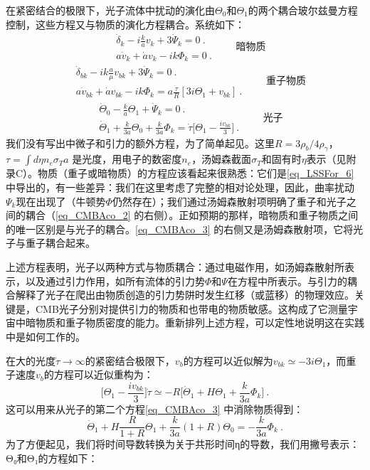 在紧密结合的极限下，光子流体中扰动的演化由$\Theta_0$和$\Theta_1$的两个耦合玻尔兹曼方程控制，这些方程又与物质的演化方程耦合。系统如下：
\begin{equation}
\begin{aligned}
& \dot{\delta}_k - i \frac{k}{a} v_k + 3 \dot{\Psi}_k = 0~. \\
& a \dot{v}_k + \dot{a} v_k - ik \Phi_k = 0~. 
\end{aligned} \quad \quad \text{暗物质}
\end{equation} 
\begin{equation}\label{eq_CMBAco_2}
\begin{aligned} 
&\dot{\delta}_{bk} - ik \frac{a}{\mu} v_{bk} + 3 \dot{\Psi}_k = 0~. \\
& a \dot{v}_{bk} + \dot{a} v_{bk} - ik \Phi_k = a  \frac{\dot{\tau}}{R}[3 i \Theta_1 + v_{bk}]~.
\end{aligned} \quad \quad \text{重子物质}
\end{equation}
\begin{equation}\label{eq_CMBAco_3}
\begin{aligned} 
&\dot{\Theta}_0 -  \frac{k}{a} \Theta_1 + \dot{\Psi}_k = 0~. \\
& \dot{\Theta}_1 +  \frac{k}{3 a} \Theta_0 +  \frac{k}{3 a} \Phi_k = \dot{\tau} \bigg[\Theta_1 -\frac{ i v_{bk}}{3}\bigg]~. 
\end{aligned} \quad \quad \text{光子}
\end{equation} 
我们没有写出中微子和引力的额外方程，为了简单起见。这里$R = 3\rho_b/4\rho_\gamma$，$\tau = \int d\eta n_e \sigma_T a$ 是光度，用电子的数密度$n_e$，汤姆森截面$\sigma_T$和固有时$\eta$表示（见附录C）。物质（重子或暗物质）的方程应该看起来很熟悉：它们是\autoref{eq_LSSFor_6} 中导出的，有一些差异：我们在这里考虑了完整的相对论处理，因此，曲率扰动$\Psi_k$现在出现了（牛顿势$\Phi$仍然存在）；我们通过汤姆森散射项明确了重子和光子之间的耦合（\autoref{eq_CMBAco_2} 的右侧）。正如预期的那样，暗物质和重子物质之间的唯一区别是与光子的耦合。\autoref{eq_CMBAco_3} 的右侧又是汤姆森散射项，它将光子与重子耦合起来。

上述方程表明，光子以两种方式与物质耦合：通过电磁作用，如汤姆森散射所表示，以及通过引力作用，如所有流体的引力势$\Phi$和$\Psi$在方程中所表示。与引力的耦合解释了光子在爬出由物质创造的引力势阱时发生红移（或蓝移）的物理效应。关键是，CMB光子分别对提供引力的物质和也带电的物质敏感。这构成了它测量宇宙中暗物质和重子物质密度的能力。重新排列上述方程，可以定性地说明这在实践中是如何工作的。

在大的光度$\dot \tau \rightarrow \infty$的紧密结合极限下，$v_b$的方程可以近似解为$v_{bk} \simeq -3 i\Theta_1$，而重子速度$v_b$的方程可以近似重构为：
\begin{equation}
\bigg[\Theta_1 - \frac{i v_{bk}}{3}\bigg]\dot \tau\simeq -R \bigg[\dot \Theta_1 +H \Theta_1 +\frac{k}{3 a}\Phi_k\bigg]~.
\end{equation}
这可以用来从光子的第二个方程\autoref{eq_CMBAco_3} 中消除物质得到：
\begin{equation}
\dot{\Theta}_1 + H \frac{R}{1 + R} \Theta_1 + \frac{k}{3a} (1 + R) \Theta_0 = -\frac{k}{3a} \Phi_k~. 
\end{equation} 
为了方便起见，我们将时间导数转换为关于共形时间η的导数，我们用撇号表示：Θ₀和Θ₁的方程如下：

